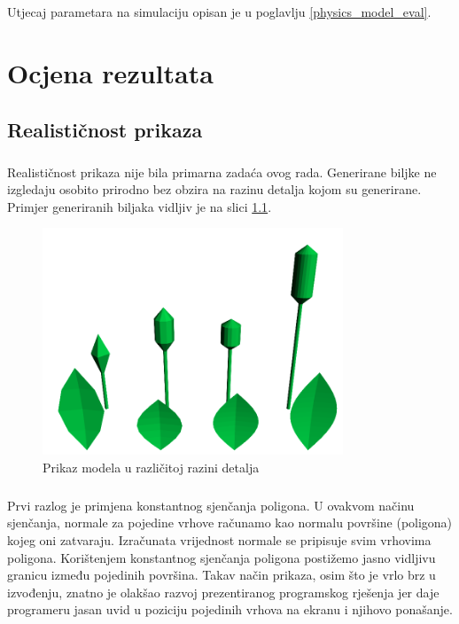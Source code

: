 \documentclass[times, utf8, diplomski]{fer}
\begin{document}
\paragraph{}
Utjecaj parametara na simulaciju opisan je u poglavlju \ref{physics_model_eval}.

\chapter{Ocjena rezultata}
\section{Realističnost prikaza}
\paragraph{}
Realističnost prikaza nije bila primarna zadaća ovog rada. Generirane biljke ne 
izgledaju osobito prirodno bez obzira na razinu detalja kojom su generirane. Primjer 
generiranih biljaka vidljiv je na slici \ref{fig:51-1}.
\begin{figure}[h]
	\centering
	\includegraphics[width=0.8\textwidth]{img/51-1}
	\caption{Prikaz modela u različitoj razini detalja}
	\label{fig:51-1}
\end{figure}
\paragraph{}
Prvi razlog je primjena konstantnog sjenčanja poligona. U ovakvom načinu 
sjenčanja, normale za pojedine vrhove računamo kao normalu površine (poligona)
kojeg oni zatvaraju. Izračunata vrijednost normale se pripisuje svim vrhovima
poligona. Korištenjem konstantnog sjenčanja poligona postižemo jasno 
vidljivu granicu između pojedinih površina. Takav način prikaza, osim što je
vrlo brz u izvođenju, znatno je olakšao razvoj prezentiranog programskog 
rješenja jer daje programeru jasan uvid u poziciju pojedinih vrhova na ekranu
i njihovo ponašanje. 
\end{document}
